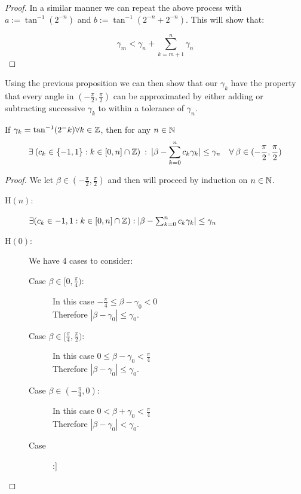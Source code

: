{\begin{proof}
In a similar manner we can repeat the above process with \(a := \tan^{-1}(2^{-n})\) and \(b := \tan^{-1}(2^{-n} + 2^{-n})\). This will show that:

\begin{displaymath}
	\gamma_m < \gamma_n + \sum_{k=m+1}^{n}\gamma_n
\end{displaymath}

\end{proof}

Using the previous proposition we can then show that our \(\gamma_k\) have the property that every angle in \((-\frac{\pi}{2}, \frac{\pi}{2})\) can be approximated by either adding or subtracting successive \(\gamma_k\) to within a tolerance of \(\gamma_n\).

\begin{Cordic Accuracy}
\label{THM_"Cordic Accuracy"}
If \(\gamma_k = \tan^{-1}(2^-k) \forall k \in \mathbb{Z}\), then for any \(n \in \mathbb{N}\) 
\[\exists \: (c_k\in \{-1,1\} : k \in [0,n] \cap \mathbb{Z}) \: : \: |\beta - \sum_{k=0}^nc_k\gamma_k| \le \gamma_n \quad \forall \: \beta \in (-\frac{\pi}{2}, \frac{\pi}{2})\]
\end{Cordic Accuracy}
\begin{proof}
We let \(\beta \in (-\frac{\pi}{2}, \frac{\pi}{2})\) and then will proceed by induction on \(n \in \mathbb{N}\).
\begin{description}
\item[\textrm{H\((n)\)}:] 
	\(\exists (c_k \in{-1, 1} : k \in [0, n] \cap \mathbb{Z}) : |\beta - \sum_{k=0}^nc_k\gamma_k| \le \gamma_n\)\\
\item[\textrm{H\((0)\)}:] 
	We have 4 cases to consider:\\
	\begin{description}
	\item[Case \(\beta \in [0, \frac{\pi}{4})\):]
		In this case \(-\frac{\pi}{4} \le \beta - \gamma_0 < 0\)\\
		Therefore \(|\beta - \gamma_0| \le \gamma_0\).
	\item[Case \(\beta \in [\frac{\pi}{4}, \frac{\pi}{2})\):]
		In this case \(0 \le \beta - \gamma_0 < \frac{\pi}{4}\)\\
		Therefore \(|\beta - \gamma_0| \le \gamma_0\).
	\item[Case \(\beta \in (-\frac{\pi}{4}, 0)\):]
		In this case \(0 < \beta + \gamma_0 < \frac{\pi}{4}\)\\
		Therefore \(|\beta - \gamma_0| < \gamma_0\).
	\item[Case \(\beta \in (-\frac{\pi}{2}, -\frac{\pi}{4}]\):]

\end{description}
\end{description}
\end{proof}}
